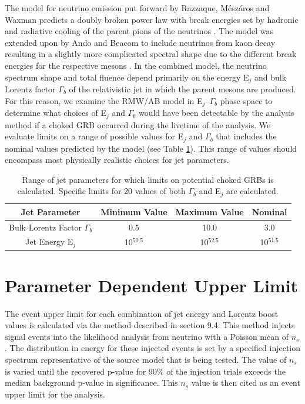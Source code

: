 \documentclass{gatech-thesis}
\begin{document}
The model for neutrino emission put forward by Razzaque, M\'{e}sz\'{a}ros and Waxman predicts a doubly broken power law with break energies set by hadronic and radiative cooling of the parent pions of the neutrinos \cite{2004PhRvL..93r1101R}. The model was extended upon by Ando and Beacom to include neutrinos from kaon decay resulting in a slightly more complicated spectral shape due to the different break energies for the respective mesons \cite{2005PhRvL..95f1103A}. In the combined model, the neutrino spectrum shape and total fluence depend primarily on the energy E$_{j}$ and bulk Lorentz factor $\Gamma_{b}$ of the relativistic jet in which the parent mesons are produced. For this reason, we examine the RMW/AB model in E$_{j}$--$\Gamma_{b}$ phase space to determine what choices of E$_{j}$ and $\Gamma_{b}$ would have been detectable by the analysis method if a choked GRB occurred during the livetime of the analysis. We evaluate limits on a range of possible values for E$_{j}$ and $\Gamma_{b}$ that includes the nominal values predicted by the model (see Table \ref{tab:chkgrb_range}). This range of values should encompass most physically realistic choices for jet parameters.

\begin{table}[h]
\caption[Choked GRB Parameter Limit Range]{Range of jet parameters for which limits on potential choked GRBs is calculated. Specific limits for 20 values of both $\Gamma_b$ and E$_j$ are calculated.}
\begin{center}
\begin{tabular}{cccc}
\toprule
\textbf{Jet Parameter} & \textbf{Minimum Value} &\textbf{Maximum Value} & \textbf{Nominal}\\
\midrule
Bulk Lorentz Factor $\Gamma_b$ & 0.5 & 10.0 & 3.0 \\
Jet Energy E$_j$ & 10$^{50.5}$ & 10$^{52.5}$ & 10$^{51.5}$ \\
\hline
\end{tabular}
\end{center}
\label{tab:chkgrb_range}
\end{table}

\section{Parameter Dependent Upper Limit}
The event upper limit for each combination of jet energy and Lorentz boost values is calculated via the method described in section 9.4. This method injects signal events into the likelihood analysis from neutrino with a Poisson mean of $n_s$. The distribution in energy for these injected events is set by a specified injection spectrum representative of the source model that is being tested. The value of $n_s$ is varied until the recovered p-value for 90$\%$ of the injection trials exceeds the median background p-value in significance. This $n_s$ value is then cited as an event upper limit for the analysis.
\end{document}
